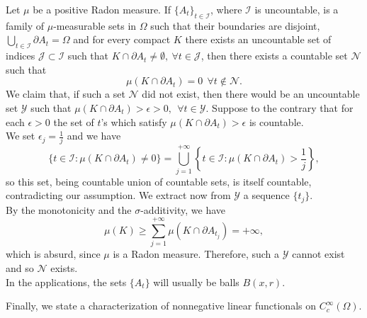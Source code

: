 \begin{remark} \label{neglcountable} Let $\mu$ be a positive Radon measure. If $\{A_{t}\}_{t \in \mathcal{I}}$, where $\mathcal{I}$ is uncountable, is a family of $\mu$-measurable sets in $\Omega$ such that their boundaries are disjoint, $\bigcup_{t \in \mathcal{I}} \partial A_{t} = \Omega$ and for every compact $K$ there exists an uncountable set of indices $\mathcal{J} \subset \mathcal{I}$ such that $K \cap \partial A_{t} \neq \emptyset, \ \forall t \in \mathcal{J}$, then there exists a countable set $\mathcal{N}$ such that
\[ \mu(K \cap \partial A_{t}) = 0 \  \ \forall t \notin \mathcal{N}. \]
We claim that, if such a set $\mathcal{N}$ did not exist, then there would be an uncountable set $\mathcal{Y}$ such that $\mu(K \cap \partial A_{t}) > \epsilon > 0, \  \ \forall t \in \mathcal{Y}$.
Suppose to the contrary that for each $\epsilon > 0$ the set of $t$'s which satisfy $\mu(K \cap \partial A_{t}) > \epsilon$ is countable. 
\\
We set $\epsilon_{j} = \frac{1}{j}$ and we have 
\[ \{ t \in \mathcal{I} : \mu(K \cap \partial A_{t}) \neq 0 \} = \bigcup_{j=1}^{+\infty} \left \{ t \in \mathcal{I}: \mu(K \cap \partial A_{t}) > \frac{1}{j} \right \}, \]
so this set, being countable union of countable sets, is itself countable, contradicting our assumption.
We extract now from $\mathcal{Y}$ a sequence $\{t_{j}\}$.
\\
By the monotonicity and the $\sigma$-additivity, we have
\[ \mu(K) \ge \sum_{j = 1}^{+\infty} \mu(K \cap \partial A_{t_{j}}) = +\infty, \]
which is absurd, since $\mu$ is a Radon measure. Therefore, such a $\mathcal{Y}$ cannot exist and so $\mathcal{N}$ exists.
\\
In the applications, the sets $\{A_{t}\}$ will usually be balls $B(x,r)$.
\end{remark}

Finally, we state a characterization of nonnegative linear functionals on $C^{\infty}_{c}(\Omega)$.

